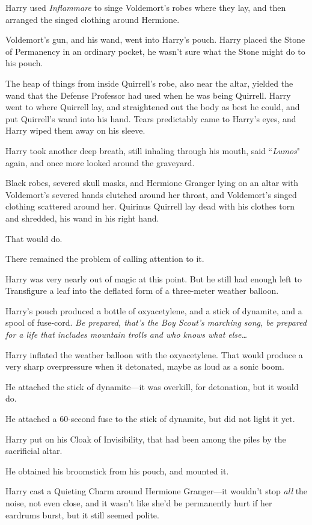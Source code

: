 Harry used \emph{Inflammare} to singe Voldemort's robes where they lay, and then arranged the singed clothing around Hermione.

Voldemort's gun, and his wand, went into Harry's pouch. Harry placed the Stone of Permanency in an ordinary pocket, he wasn't sure what the Stone might do to his pouch.

The heap of things from inside Quirrell's robe, also near the altar, yielded the wand that the Defense Professor had used when he was being Quirrell. Harry went to where Quirrell lay, and straightened out the body as best he could, and put Quirrell's wand into his hand. Tears predictably came to Harry's eyes, and Harry wiped them away on his sleeve.

Harry took another deep breath, still inhaling through his mouth, said ``\emph{Lumos}" again, and once more looked around the graveyard.

Black robes, severed skull masks, and Hermione Granger lying on an altar with Voldemort's severed hands clutched around her throat, and Voldemort's singed clothing scattered around her. Quirinus Quirrell lay dead with his clothes torn and shredded, his wand in his right hand.

That would do.

There remained the problem of calling attention to it.

Harry was very nearly out of magic at this point. But he still had enough left to Transfigure a leaf into the deflated form of a three-meter weather balloon.

Harry's pouch produced a bottle of oxyacetylene, and a stick of dynamite, and a spool of fuse-cord. \emph{Be prepared, that's the Boy Scout's marching song, be prepared for a life that includes mountain trolls and who knows what else{\ldots}}

Harry inflated the weather balloon with the oxyacetylene. That would produce a very sharp overpressure when it detonated, maybe as loud as a sonic boom.

He attached the stick of dynamite—it was overkill, for detonation, but it would do.

He attached a 60-second fuse to the stick of dynamite, but did not light it yet.

Harry put on his Cloak of Invisibility, that had been among the piles by the sacrificial altar.

He obtained his broomstick from his pouch, and mounted it.

Harry cast a Quieting Charm around Hermione Granger—it wouldn't stop \emph{all} the noise, not even close, and it wasn't like she'd be permanently hurt if her eardrums burst, but it still seemed polite.

